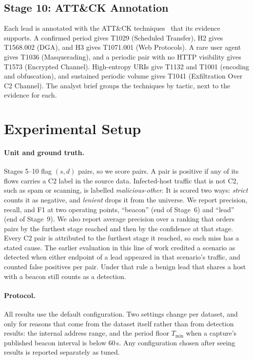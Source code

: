 \documentclass[runningheads]{llncs}
\begin{document}
\subsection{Stage 10: ATT\&CK Annotation}

Each lead is annotated with the ATT\&CK techniques~\cite{strom2018attack} that its evidence supports. A confirmed period gives T1029 (Scheduled Transfer), H2 gives T1568.002 (DGA), and H3 gives T1071.001 (Web Protocols). A rare user agent gives T1036 (Masquerading), and a periodic pair with no HTTP visibility gives T1573 (Encrypted Channel). High-entropy URIs give T1132 and T1001 (encoding and obfuscation), and sustained periodic volume gives T1041 (Exfiltration Over C2 Channel). The analyst brief groups the techniques by tactic, next to the evidence for each.

\section{Experimental Setup}\label{sec:setup}

\paragraph{Unit and ground truth.} Stages 5--10 flag $(s,d)$ pairs, so we score pairs. A pair is positive if any of its flows carries a C2 label in the source data. Infected-host traffic that is not C2, such as spam or scanning, is labelled \emph{malicious-other}. It is scored two ways: \emph{strict} counts it as negative, and \emph{lenient} drops it from the universe. We report precision, recall, and F1 at two operating points, ``beacon'' (end of Stage~6) and ``lead'' (end of Stage~9). We also report average precision over a ranking that orders pairs by the furthest stage reached and then by the confidence at that stage. Every C2 pair is attributed to the furthest stage it reached, so each miss has a stated cause. The earlier evaluation in this line of work credited a scenario as detected when either endpoint of a lead appeared in that scenario's traffic, and counted false positives per pair. Under that rule a benign lead that shares a host with a beacon still counts as a detection.

\paragraph{Protocol.} All results use the default configuration. Two settings change per dataset, and only for reasons that come from the dataset itself rather than from detection results: the internal address range, and the period floor $T_{\min}$ when a capture's published beacon interval is below 60\,s. Any configuration chosen after seeing results is reported separately as tuned.
\end{document}
